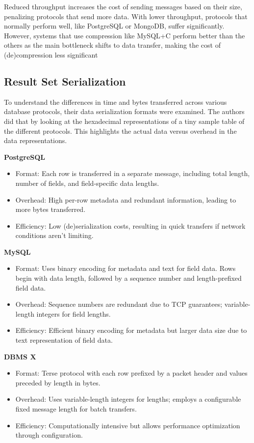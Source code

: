 \documentclass[sigconf]{acmart}
\begin{document}
Reduced throughput increases the cost of sending messages based on their size, penalizing protocols that send more data. With lower throughput, protocols that normally perform well, like PostgreSQL or MongoDB, suffer significantly. However, systems that use compression like MySQL+C perform better than the others as the main bottleneck shifts to data transfer, making the cost of (de)compression less significant

\subsection{Result Set Serialization}
To understand the differences in time and bytes transferred across various database protocols, their data serialization formats were examined. The authors did that by looking at the hexadecimal representations of a tiny sample table of the different protocols. This highlights the actual data versus overhead in the data representations.

\textbf{PostgreSQL}
\begin{itemize}
  \item Format: Each row is transferred in a separate message, including total length, number of fields, and field-specific data lengths.
  \item Overhead: High per-row metadata and redundant information, leading to more bytes transferred.
  \item Efficiency: Low (de)serialization costs, resulting in quick transfers if network conditions aren't limiting.
\end{itemize}

\textbf{MySQL}
\begin{itemize}
  \item Format: Uses binary encoding for metadata and text for field data. Rows begin with data length, followed by a sequence number and length-prefixed field data.
  \item Overhead: Sequence numbers are redundant due to TCP guarantees; variable-length integers for field lengths.
  \item Efficiency: Efficient binary encoding for metadata but larger data size due to text representation of field data.
\end{itemize}

\textbf{DBMS X}
\begin{itemize}
  \item Format: Terse protocol with each row prefixed by a packet header and values preceded by length in bytes.
  \item Overhead: Uses variable-length integers for lengths; employs a configurable fixed message length for batch transfers.
  \item Efficiency: Computationally intensive but allows performance optimization through configuration.
\end{itemize}
\end{document}
